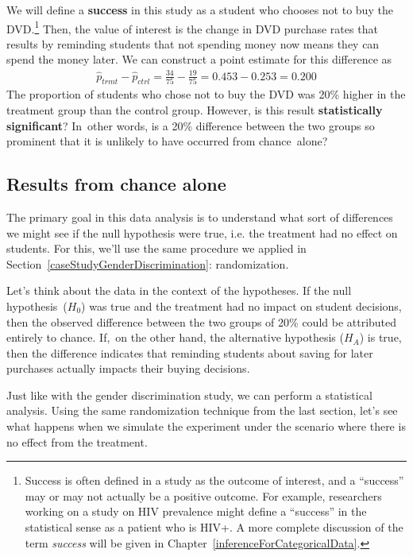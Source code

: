 We will define a \textbf{success} in this study as a student who chooses not to buy the DVD.\footnote{Success is often defined in a study as the outcome of interest, and a ``success'' may or may not actually be a positive outcome. For example, researchers working on a study on HIV prevalence might define a ``success'' in the statistical sense as a patient who is HIV+. A more complete discussion of the term \emph{success} will be given in Chapter~\ref{inferenceForCategoricalData}. } Then, the value of interest is the change in DVD purchase rates that results by reminding students that not spending money now means they can spend the money later.
We can construct a point estimate for this difference as
\begin{align*}
\hat{p}_{trmt} - \hat{p}_{ctrl}
  = \frac{34}{75} - \frac{19}{75}
  = 0.453 - 0.253
  = 0.200
\end{align*}
The proportion of students who chose not to buy the DVD was 20\% higher in the treatment group than the control group.
However, is this result \textbf{statistically significant}? In~other words, is a 20\% difference between the two groups so prominent that it is unlikely to have occurred from chance~alone?

\subsection{Results from chance alone}

The primary goal in this data analysis is to understand what sort of differences we might see if the null hypothesis were true, i.e. the treatment had no effect on students. For this, we'll use the same procedure we applied in Section~\ref{caseStudyGenderDiscrimination}: randomization.

Let's think about the data in the context of the hypotheses. If the null  hypothesis~($H_0$) was true and the treatment had no impact on student decisions, then the observed difference between the two groups of 20\% could be attributed entirely to chance. If,~on the other hand, the alternative hypothesis ($H_A$) is true, then the difference indicates that reminding students about saving for later purchases actually impacts their buying decisions.

Just like with the gender discrimination study, we can perform a statistical analysis. Using the same randomization technique from the last section, let's see what happens when we simulate the experiment under the scenario where there is no effect from the treatment.

